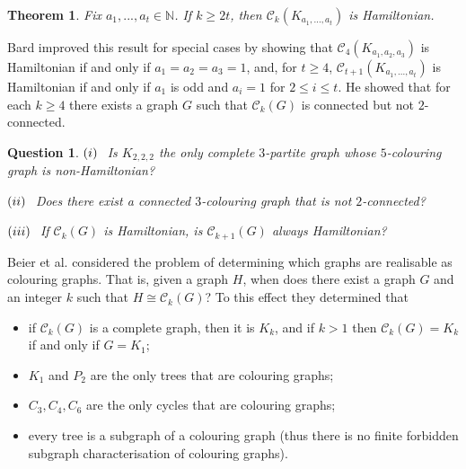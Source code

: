 \documentclass[12pt]{article}%
\newtheorem{theorem}{Theorem}[section]
\newtheorem{question}{Question}[section]
\begin{document}
\begin{theorem}
\emph{\cite{26CM-Bard}}\hspace{0.1in}Fix $a_{1},...,a_{t}\in\mathbb{N}$. If
$k\geq2t$, then $\mathcal{C}_{k}(K_{a_{1},...,a_{t}})$ is Hamiltonian.
\end{theorem}

Bard improved this result for special cases by showing that $\mathcal{C}%
_{4}(K_{a_{1},a_{2},a_{3}})$ is Hamiltonian if and only if $a_{1}=a_{2}%
=a_{3}=1$, and, for $t\geq4$, $\mathcal{C}_{t+1}(K_{a_{1},...,a_{t}})$ is
Hamiltonian if and only if $a_{1}$ is odd and $a_{i}=1$ for $2\leq i\leq t$.
He showed that for each $k\geq4$ there exists a graph $G$ such that
$\mathcal{C}_{k}(G)$ is connected but not $2$-connected.

\begin{question}
\emph{\cite{26CM-Bard}}\hspace{0.1in}$(i)\hspace{0.1in}$Is $K_{2,2,2}$ the
only complete $3$-partite graph whose $5$-colouring graph is non-Hamiltonian?

$(ii)\hspace{0.1in}$Does there exist a connected $3$-colouring graph that is
not $2$-connected?

$(iii)\hspace{0.1in}$If $\mathcal{C}_{k}(G)$ is Hamiltonian, is $\mathcal{C}%
_{k+1}(G)$ always Hamiltonian?
\end{question}



Beier et al. \cite{26CM-Beier} considered the problem of determining which
graphs are realisable as colouring graphs. That is, given a graph $H$, when
does there exist a graph $G$ and an integer $k$ such that $H\cong%
\mathcal{C}_{k}(G)$? To this effect they determined that

\begin{itemize}
\item if $\mathcal{C}_{k}(G)$ is a complete graph, then it is $K_{k}$, and if
$k>1$ then $\mathcal{C}_{k}(G)=K_{k}$ if and only if $G=K_{1}$;

\item $K_{1}$ and $P_{2}$ are the only trees that are colouring graphs;

\item $C_{3},C_{4},C_{6}$ are the only cycles that are colouring graphs;

\item every tree is a subgraph of a colouring graph (thus there is no finite
forbidden subgraph characterisation of colouring graphs).
\end{itemize}
\end{document}
